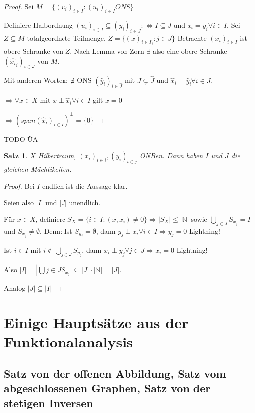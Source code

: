\documentclass[ngerman]{report}
\theoremstyle{plain}%
\newtheorem{thm}{Satz}[chapter]
\theoremstyle{definition}%
\theoremstyle{myStyle}
\newcommand{\N}{\mathbb{N}}
\newcommand{\df}[1][]{%
	\overset{#1}{\Rightarrow}
}
\newcommand{\aq}{\Leftrightarrow} %
\newcommand{\ff}[3]{(#1_#2)_{#2\in#3}}
\begin{document}
	\begin{proof}
		Sei $M = \{\ff{u}{i}{I} : \ff{u}{i}{I} ONS \}$ \par
		Definiere Halbordnung $\ff{u}{i}{I} \subseteq \ff{y}{i}{J} :\aq I \subseteq J$ und $x_i = y_i \forall i \in I$.
		Sei $Z \subseteq M$ totalgeordnete Teilmenge, $Z = \{(x)_{i\in I_j} : j\in J \}$
		Betrachte $\ff{x}{i}{I}$ ist obere Schranke von $Z$. Nach Lemma von Zorn $\exists$ also eine obere Schranke $\ff{\hat{{x_i}}}{i}{J}$ von $M$. \par
		Mit anderen Worten: $\centernot \exists$ ONS $\ff{\hat{{y}}}{i}{\hat{J}}$ mit $J \subsetneq \hat{J}$ und $\hat{x}_i = \hat{y}_i \forall i\in J.$\par
		$\df \forall x\in X$ mit $x\perp \hat{x}_i \forall i \in I$ gilt $x= 0$ \par
		$\df (span\ff{\hat{{x}}}{i}{I})^\perp = \{0\}$
	\end{proof}
 TODO ÜA \par 
	\begin{thm}
		$X$ Hilbertraum, $\ff{x}{i}{i}, \ff{y}{i}{j}$ ONBen. Dann haben $I$ und $J$ die gleichen Mächtikeiten.
	\end{thm}
	\begin{proof}
		Bei $I$ endlich ist die Aussage klar. \par
		Seien also $|I|$ und $|J|$ unendlich.  \par
		Für $x\in X$, definiere $S_X = \{i\in I: (x,x_i) \neq 0\} \df |S_X| \leq |\N|$
		sowie $\bigcup_{j\in J} S_{x_j} = I$ und $S_{x_j} \neq \emptyset$. Denn:
		Ist $S_{y_j} = \emptyset$, dann $y_j \perp x_i \forall i \in I \df y_j =0$ Lightning! \par
		Ist $i\in I$ mit $i \not \in \bigcup_{j\in J} S_{y_j}$, dann $x_i \perp y_j \forall j\in J \df x_i = 0$ Lightning! \par
		Also $|I| = |\bigcup{j\in J} S_{x_j}| \subseteq |J| \cdot |\N| = |J|$. \par
		Analog $|J| \subseteq |I|$
	\end{proof}

\chapter{Einige Hauptsätze aus der Funktionalanalysis}			
	\section{Satz von der offenen Abbildung, Satz vom abgeschlossenen Graphen, Satz von der stetigen Inversen}
	
\end{document}
